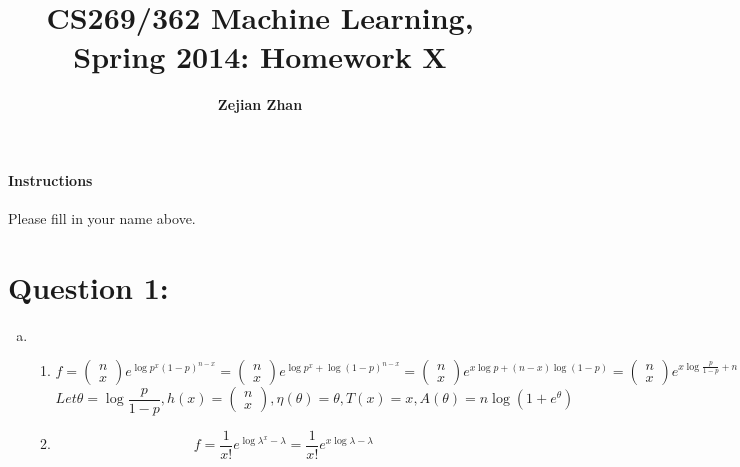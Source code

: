 \documentclass[letterpaper,11pt]{article}
\title{CS269/362 Machine Learning, Spring 2014: Homework X}
\date{}
\author{\bf Zejian Zhan}
\begin{document}
\maketitle

\paragraph*{Instructions} Please fill in your name above.

\section{Question 1:}
\begin{enumerate}[(a)]
\item \begin{enumerate}[(1)]
\item{
\begin{dmath}
f=\left(\begin{array}{c}n\\ x\end{array}\right)e^{\log{p^{x}}  (1-p)^{n-x}}=
\left(\begin{array}{c}n\\ x\end{array}\right)e^{\log{}{p^{x}} +\log{}{(1-p)^{n-x}}}=\left(\begin{array}{c}n\\ x\end{array}\right)e^{x\log{}{p}  +(n-x)\log{}{(1-p)}}=\left(\begin{array}{c}n\\ x\end{array}\right)e^{x\log\frac{p}{1-p}+n\log(1-p)}=\left(\begin{array}{c}n\\ x\end{array}\right)e^{x\theta-n\log{(1+e^{\theta})}}
\end{dmath}
\begin{equation}
Let \theta=\log{\frac{p}{1-p}},h(x)=\left(\begin{array}{c}n\\ x\end{array}\right),\eta(\theta)=\theta,T(x)=x,A(\theta)=n\log{(1+e^{\theta})}
\end{equation}
}
\item{
\begin{dmath}
f=\frac{1}{x!}e^{\log{}{\lambda^{x}}-\lambda}=\frac{1}{x!}e^{x\log{}{\lambda}-\lambda}
\end{dmath}
\begin{equation}

\end{equation}}
\end{enumerate}
\end{enumerate}
\end{document}
